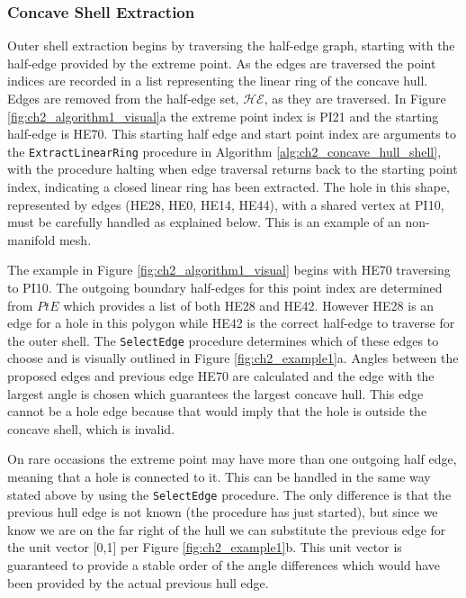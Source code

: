 \subsubsection{Concave Shell Extraction}
Outer shell extraction begins by traversing the half-edge graph, starting with the half-edge provided by the extreme point. As the edges are traversed the point indices are recorded in a list representing the linear ring of the concave hull. Edges are removed from the half-edge set, $\mathcal{HE}$, as they are traversed.  In Figure \ref{fig:ch2_algorithm1_visual}a the extreme point index is PI21 and the starting half-edge is HE70. This starting half edge and start point index are arguments to the \texttt{ExtractLinearRing} procedure in Algorithm \ref{alg:ch2_concave_hull_shell}, with the procedure halting when edge traversal returns back to the starting point index, indicating a closed linear ring has been extracted. The hole in this shape, represented by edges (HE28, HE0, HE14, HE44), with a shared vertex at PI10, must be carefully handled as explained below. This is an example of an non-manifold mesh.

The example in Figure \ref{fig:ch2_algorithm1_visual} begins with HE70 traversing to PI10. The outgoing boundary half-edges for this point index are determined from $PtE$ which provides a list of both HE28 and HE42. However HE28 is an edge for a hole in this polygon while HE42 is the correct half-edge to traverse for the outer shell. The \texttt{SelectEdge} procedure determines which of these edges to choose and is visually outlined in Figure \ref{fig:ch2_example1}a. Angles between the proposed edges and previous edge HE70 are calculated and the edge with the largest angle is chosen which guarantees the largest concave hull.  This edge cannot be a hole edge because that would imply that the hole is outside the concave shell, which is invalid.

On rare occasions the extreme point may have more than one outgoing half edge, meaning that a hole is connected to it.  This can be handled in the same way stated above by using the \texttt{SelectEdge} procedure. The only difference is that the previous hull edge is not known (the procedure has just started), but since we know we are on the far right of the hull we can substitute the previous edge for the unit vector [0,1] per Figure \ref{fig:ch2_example1}b. This unit vector is guaranteed to provide a stable order of the angle differences which would have been provided by the actual previous hull edge.

